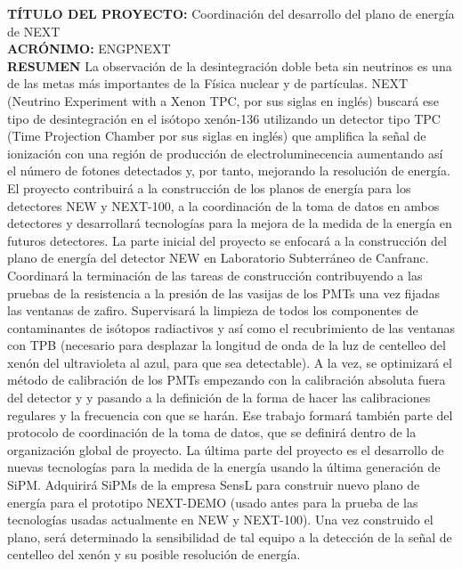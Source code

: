 \documentclass[a4paper,11pt,oneside]{article}
\begin{document}
\noindent\textbf{T\'ITULO DEL PROYECTO:} Coordinaci\'on del desarrollo del plano de energ\'ia de NEXT\\
\textbf{ACR\'ONIMO:} ENGPNEXT\\
\textbf{RESUMEN} {\color{blue}{M\'aximo 3500 caracteres (incluyendo
    espacios en blanco):}}
La observación de la desintegración doble beta sin neutrinos es una de
las metas más importantes de la Física nuclear y de
partículas. NEXT (Neutrino Experiment with a Xenon TPC, por sus
siglas en inglés) buscará ese tipo de desintegración en el
isótopo xenón-136 utilizando un detector tipo TPC (Time Projection
Chamber por sus siglas en inglés) que amplifica la señal de ionización
con una región de producción de electroluminecencia aumentando así
el número de fotones detectados y, por tanto, mejorando la
resolución de energía. El proyecto contribuirá a la
construcción de los planos de energía para los detectores NEW y
NEXT-100, a la coordinaci\'on de la toma de datos en ambos detectores y desarrollará tecnologías para la mejora de la medida
de la energía en futuros detectores. La parte inicial del proyecto
se enfocará a la construcción del plano de energía del detector
NEW en Laboratorio Subterráneo de Canfranc. Coordinará la terminación
de las tareas de construcción contribuyendo a las pruebas de la
resistencia a la presi\'on de las vasijas de los PMTs una vez fijadas
las ventanas de zafiro. Supervisar\'a la limpieza de todos los
componentes de contaminantes de isótopos radiactivos y as\'i como el
recubrimiento de las ventanas con TPB (necesario para desplazar la
longitud de onda de la luz de centelleo del xenón del ultravioleta al
azul, para que sea detectable). A
la vez, se optimizará el método de calibración de los PMTs empezando
con la calibración absoluta fuera del detector y y pasando a la
definición de la forma de hacer las calibraciones regulares y la
frecuencia con que se harán. Ese trabajo formará también parte del
protocolo de coordinación de la toma de datos, que se definirá dentro
de la organizaci\'on global de proyecto. La última parte del proyecto es el desarrollo de nuevas tecnologías para la medida de la energía usando la última generación de SiPM. Adquirirá SiPMs de la empresa SensL para construir nuevo plano de energía para el prototipo NEXT-DEMO (usado antes para la prueba de las tecnologías usadas actualmente en NEW y NEXT-100). Una vez construido el plano, será determinado la sensibilidad de tal equipo a la detección de la señal de centelleo del xenón y su posible resolución de energía.
\vspace{12pt}
\end{document}
